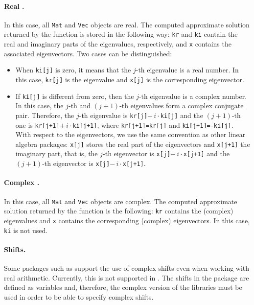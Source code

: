 \paragraph{Real \slepc.} In this case, all \texttt{Mat} and \texttt{Vec} objects are real. The computed approximate solution returned by the function  is stored in the following way: \texttt{kr} and \texttt{ki} contain the real and imaginary parts of the eigenvalues, respectively, and \texttt{x} contains the associated eigenvectors. Two cases can be distinguished:

\begin{itemize}
\item	When \texttt{ki[j]} is zero, it means that the $j$-th eigenvalue is a real number. In this case, \texttt{kr[j]} is the eigenvalue and \texttt{x[j]} is the corresponding eigenvector.

\item	If \texttt{ki[j]} is different from zero, then the $j$-th eigenvalue is a complex number. In this case, the $j$-th and $(j\!\!+\!\!1)$-th eigenvalues form a complex conjugate pair. Therefore, the $j$-th eigenvalue is \texttt{kr[j]}$+\,i\cdot$\texttt{ki[j]} and the $(j\!+\!1)$-th one is \texttt{kr[j+1]}$+\,i\cdot$\texttt{ki[j+1]}, where \texttt{kr[j+1]=kr[j]} and \texttt{ki[j+1]=-ki[j]}. 
With respect to the eigenvectors, we use the same convention as other linear algebra packages: \texttt{x[j]} stores the real part of the eigenvectors and \texttt{x[j+1]} the imaginary part, that is, the $j$-th eigenvector is \texttt{x[j]}$+\,i\cdot$\texttt{x[j+1]} and the $(j\!\!+\!\!1)$-th eigenvector is \texttt{x[j]}$-\,i\cdot$\texttt{x[j+1]}. 
\end{itemize}

\paragraph{Complex \slepc.} In this case, all \texttt{Mat} and \texttt{Vec} objects are complex. The computed approximate solution returned by the function  is the following: \texttt{kr} contains the (complex) eigenvalues and \texttt{x} contains the corresponding (complex) eigenvectors. In this case, \texttt{ki} is not used.

\paragraph{Shifts.} Some packages such as \arpack{} support the use of complex shifts even when working with real arithmetic. Currently, this is not supported in \slepc. The shifts in the  package are defined as  variables and, therefore, the complex version of the libraries must be used in order to be able to specify complex shifts.

